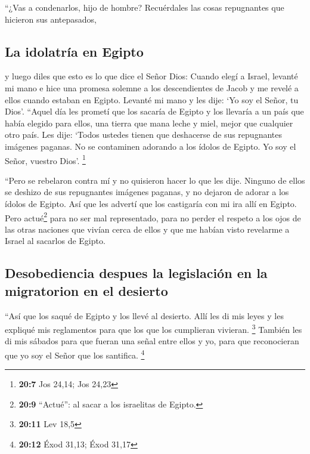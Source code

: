  ``¿Vas a condenarlos, hijo de hombre? Recuérdales las
cosas repugnantes que hicieron sus antepasados,

\hypertarget{la-idolatruxeda-en-egipto}{%
\subsection{La idolatría en Egipto}\label{la-idolatruxeda-en-egipto}}

 y luego diles que esto es lo que dice el Señor Dios:
Cuando elegí a Israel, levanté mi mano e hice una promesa solemne a los
descendientes de Jacob y me revelé a ellos cuando estaban en Egipto.
Levanté mi mano y les dije: `Yo soy el Señor, tu Dios'. 
``Aquel día les prometí que los sacaría de Egipto y los llevaría a un
país que había elegido para ellos, una tierra que mana leche y miel,
mejor que cualquier otro país.  Les dije: `Todos ustedes
tienen que deshacerse de sus repugnantes imágenes paganas. No se
contaminen adorando a los ídolos de Egipto. Yo soy el Señor, vuestro
Dios'. \footnote{\textbf{20:7} Jos 24,14; Jos 24,23}

 ``Pero se rebelaron contra mí y no quisieron hacer lo que
les dije. Ninguno de ellos se deshizo de sus repugnantes imágenes
paganas, y no dejaron de adorar a los ídolos de Egipto. Así que les
advertí que los castigaría con mi ira allí en Egipto. 
Pero actué\footnote{\textbf{20:9} ``Actué'': al sacar a los israelitas
  de Egipto.} para no ser mal representado, para no perder el respeto a
los ojos de las otras naciones que vivían cerca de ellos y que me habían
visto revelarme a Israel al sacarlos de Egipto.

\hypertarget{desobediencia-despues-la-legislaciuxf3n-en-la-migratorion-en-el-desierto}{%
\subsection{Desobediencia despues la legislación en la migratorion en el
desierto}\label{desobediencia-despues-la-legislaciuxf3n-en-la-migratorion-en-el-desierto}}

 ``Así que los saqué de Egipto y los llevé al desierto.
 Allí les di mis leyes y les expliqué mis reglamentos
para que los que los cumplieran vivieran. \footnote{\textbf{20:11} Lev
  18,5}  También les di mis sábados para que fueran una
señal entre ellos y yo, para que reconocieran que yo soy el Señor que
los santifica. \footnote{\textbf{20:12} Éxod 31,13; Éxod 31,17}

